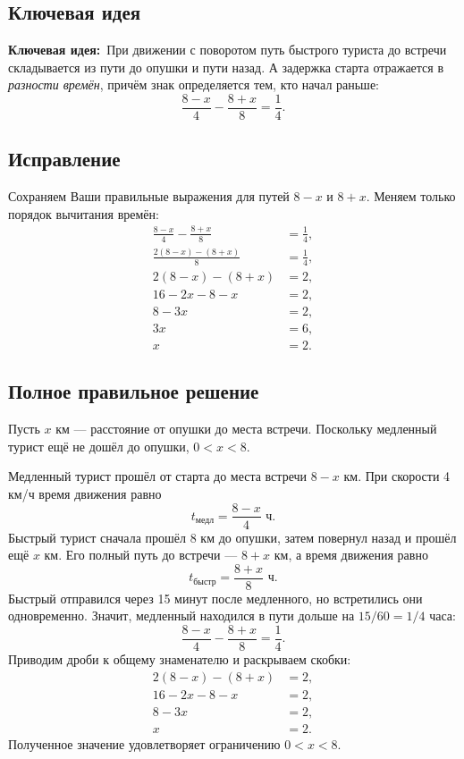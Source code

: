 \documentclass[a4paper,12pt]{article}
\newcommand{\keylabel}{\textcolor{accent}{\textbf{Ключевая идея:}}}
\begin{document}
\subsection*{Ключевая идея}
\keylabel\ При движении с поворотом путь быстрого туриста до встречи складывается из пути до опушки и пути назад. А задержка старта отражается в \emph{разности времён}, причём знак определяется тем, кто начал раньше:
\[
 \frac{8-x}{4}-\frac{8+x}{8}=\frac14.
\]

\subsection*{Исправление}
Сохраняем Ваши правильные выражения для путей $8-x$ и $8+x$. Меняем только порядок вычитания времён:
\[
\begin{aligned}
\frac{8-x}{4}-\frac{8+x}{8}&=\frac14,\\[1mm]
\frac{2(8-x)-(8+x)}8&=\frac14,\\
2(8-x)-(8+x)&=2,\\
16-2x-8-x&=2,\\
8-3x&=2,\\
3x&=6,\\
x&=2.
\end{aligned}
\]

\subsection*{Полное правильное решение}
Пусть $x$ км --- расстояние от опушки до места встречи. Поскольку медленный турист ещё не дошёл до опушки, $0<x<8$.

Медленный турист прошёл от старта до места встречи $8-x$ км. При скорости 4 км/ч время движения равно
\[
 t_{\text{медл}}=\frac{8-x}{4}\text{ ч}.
\]
Быстрый турист сначала прошёл 8 км до опушки, затем повернул назад и прошёл ещё $x$ км. Его полный путь до встречи --- $8+x$ км, а время движения равно
\[
 t_{\text{быстр}}=\frac{8+x}{8}\text{ ч}.
\]
Быстрый отправился через 15 минут после медленного, но встретились они одновременно. Значит, медленный находился в пути дольше на $15/60=1/4$ часа:
\[
\frac{8-x}{4}-\frac{8+x}{8}=\frac14.
\]
Приводим дроби к общему знаменателю и раскрываем скобки:
\[
\begin{aligned}
2(8-x)-(8+x)&=2,\\
16-2x-8-x&=2,\\
8-3x&=2,\\
x&=2.
\end{aligned}
\]
Полученное значение удовлетворяет ограничению $0<x<8$.
\end{document}
